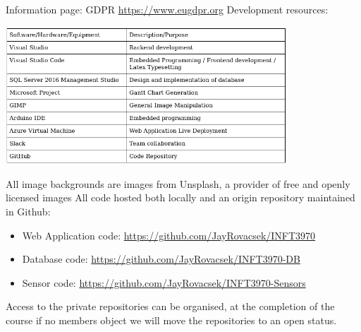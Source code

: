 \documentclass{article}
\begin{document}
\begin{thebibliography}{9}
        \newpage

            Information page: GDPR
            \url{https://www.eugdpr.org}
            Development resources:
            \begin{center}
                \includegraphics[width=400px]{Images/DevelopmentResources.jpg}
            \end{center}
    \end{thebibliography}
    All image backgrounds are images from Unsplash, a provider of free and openly licensed images\cite{Unsplash}
    \vspace{5mm}
    All code hosted both locally and an origin repository maintained in Github:
    \begin{itemize}
        \item Web Application code: \url{https://github.com/JayRovacsek/INFT3970}
        \item Database code: \url{https://github.com/JayRovacsek/INFT3970-DB}
        \item Sensor code: \url{https://github.com/JayRovacsek/INFT3970-Sensors}
    \end{itemize}
    Access to the private repositories can be organised, at the completion of the course if no members
    object we will move the repositories to an open status.
\end{document}
